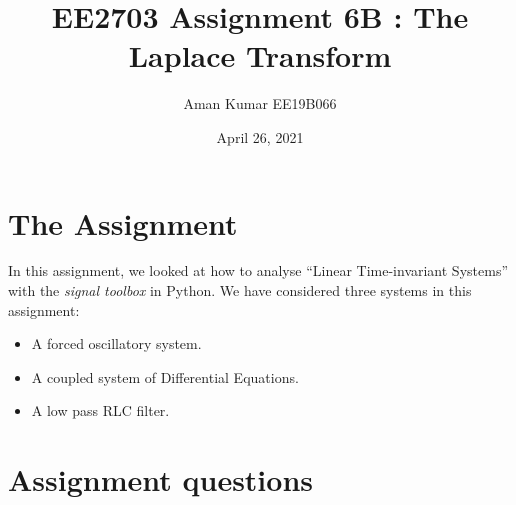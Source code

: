 \documentclass[11pt, a4paper]{article}
\title{EE2703 Assignment 6B : The Laplace Transform}
\author{Aman Kumar EE19B066}
\date{April 26, 2021}
\begin{document}
\maketitle

\section{The Assignment}
In this assignment, we looked at how to analyse “Linear Time-invariant Systems”
with the \textit{signal toolbox} in Python. We have considered three systems in this assignment:
\begin{itemize}
    \item A forced oscillatory system.
    \item A coupled system of Differential Equations.
    \item A low pass  RLC filter.
\end{itemize}

\section{Assignment questions}
\end{document}
